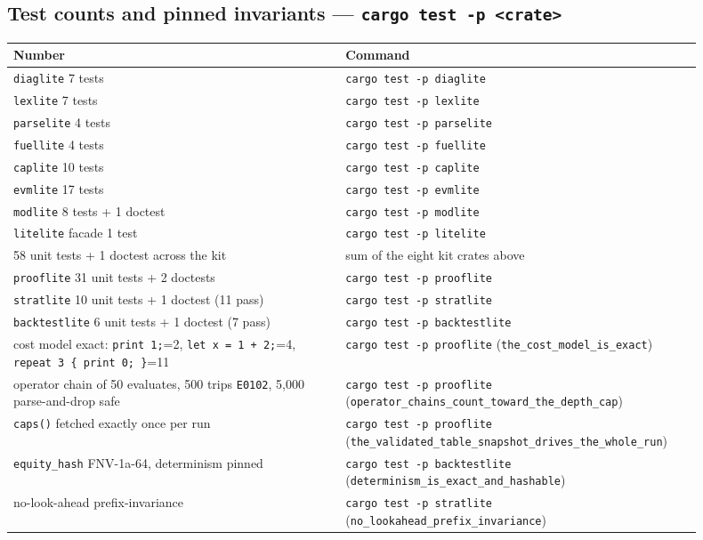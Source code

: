 \documentclass[11pt]{article}
\newcommand{\code}[1]{\texttt{#1}}
\begin{document}
\subsection*{Test counts and pinned invariants --- \code{cargo test -p <crate>}}

\begingroup\small
\begin{longtable}{p{0.450\linewidth} p{0.450\linewidth}}
\toprule
\textbf{Number} & \textbf{Command} \\
\midrule\endhead
\code{diaglite} 7 tests & \code{cargo test -p diaglite} \\
\code{lexlite} 7 tests & \code{cargo test -p lexlite} \\
\code{parselite} 4 tests & \code{cargo test -p parselite} \\
\code{fuellite} 4 tests & \code{cargo test -p fuellite} \\
\code{caplite} 10 tests & \code{cargo test -p caplite} \\
\code{evmlite} 17 tests & \code{cargo test -p evmlite} \\
\code{modlite} 8 tests + 1 doctest & \code{cargo test -p modlite} \\
\code{litelite} facade 1 test & \code{cargo test -p litelite} \\
58 unit tests + 1 doctest across the kit & sum of the eight kit crates above \\
\code{prooflite} 31 unit tests + 2 doctests & \code{cargo test -p prooflite} \\
\code{stratlite} 10 unit tests + 1 doctest (11 pass) & \code{cargo test -p stratlite} \\
\code{backtestlite} 6 unit tests + 1 doctest (7 pass) & \code{cargo test -p backtestlite} \\
cost model exact: \code{print 1;}=2, \code{let x = 1 + 2;}=4, \code{repeat 3 \{ print 0; \}}=11 & \code{cargo test -p prooflite} (\code{the\_cost\_model\_is\_exact}) \\
operator chain of 50 evaluates, 500 trips \code{E0102}, 5,000 parse-and-drop safe & \code{cargo test -p prooflite} (\code{operator\_chains\_count\_toward\_the\_depth\_cap}) \\
\code{caps()} fetched exactly once per run & \code{cargo test -p prooflite} (\code{the\_validated\_table\_snapshot\_drives\_the\_whole\_run}) \\
\code{equity\_hash} FNV-1a-64, determinism pinned & \code{cargo test -p backtestlite} (\code{determinism\_is\_exact\_and\_hashable}) \\
no-look-ahead prefix-invariance & \code{cargo test -p stratlite} (\code{no\_lookahead\_prefix\_invariance}) \\
\bottomrule
\end{longtable}\endgroup
\end{document}
